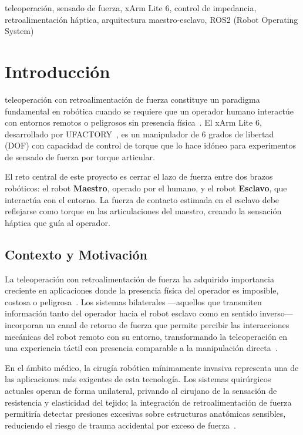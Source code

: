 \documentclass[journal,10pt,twoside]{IEEEtran}
\begin{document}
\begin{IEEEkeywords}
  teleoperación, sensado de fuerza, xArm Lite 6, control de impedancia,
  retroalimentación háptica, arquitectura maestro-esclavo, ROS2 (Robot Operating System)
\end{IEEEkeywords}

\section{Introducción}

 teleoperación con retroalimentación de fuerza
constituye un paradigma fundamental en robótica cuando se requiere que
un operador humano interactúe con entornos remotos o peligrosos sin
presencia física~\cite{murray1994}. El xArm Lite 6, desarrollado por
UFACTORY~\cite{xarm_github}, es un manipulador de 6 grados de libertad
(DOF) con capacidad de control de torque que lo hace idóneo para experimentos
de sensado de fuerza por torque articular.

\begin{theorybox}[Motivación]
  El reto central de este proyecto es cerrar el lazo de fuerza entre
  dos brazos robóticos: el robot \textbf{Maestro}, operado por el humano,
  y el robot \textbf{Esclavo}, que interactúa con el entorno.
  La fuerza de contacto estimada en el esclavo debe reflejarse como
  torque en las articulaciones del maestro, creando la sensación
  háptica que guía al operador.
\end{theorybox}

\subsection{Contexto y Motivación}

La teleoperación con retroalimentación de fuerza ha adquirido
importancia creciente en aplicaciones donde la presencia física del
operador es imposible, costosa o peligrosa~\cite{niemeyer2008}.
Los sistemas bilaterales —aquellos que transmiten información tanto
del operador hacia el robot esclavo como en sentido inverso—
incorporan un canal de retorno de fuerza que permite percibir las
interacciones mecánicas del robot remoto con su entorno,
transformando la teleoperación en una experiencia táctil con
presencia comparable a la manipulación directa~\cite{murray1994}.

En el ámbito médico, la cirugía robótica mínimamente invasiva
representa una de las aplicaciones más exigentes de esta tecnología.
Los sistemas quirúrgicos actuales operan de forma unilateral,
privando al cirujano de la sensación de resistencia y elasticidad
del tejido; la integración de retroalimentación de fuerza permitiría
detectar presiones excesivas sobre estructuras anatómicas sensibles,
reduciendo el riesgo de trauma accidental por exceso de
fuerza~\cite{thompson2001}.
\end{document}
